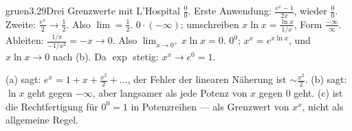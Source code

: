 \begin{loesungkarte}{gruen}{3.29}{Drei Grenzwerte mit L'Hospital}
$\frac00$. Erste Anwendung: $\frac{e^{x} - 1}{2x}$, wieder $\frac00$. Zweite: $\frac{e^{x}}2\to\frac12$. Also $\lim = \frac12$.
$0\cdot(-\infty)$; umschreiben $x\ln x = \frac{\ln x}{1/x}$, Form $\frac{-\infty}{\infty}$. Ableiten: $\frac{1/x}{-1/x^{2}} = -x\to0$. Also $\lim_{x\to0^{+}}x\ln x = 0$.
$0^{0}$; $x^{x} = e^{x\ln x}$, und $x\ln x\to0$ nach (b). Da $\exp$ stetig: $x^{x}\to e^{0} = 1$.
\begin{mitnehmen}\kastentext
(a) sagt: $e^{x} = 1 + x + \frac{x^{2}}2 + \dots$, der Fehler der linearen Näherung ist $\sim\frac{x^{2}}2$. (b) sagt: $\ln x$ geht gegen $-\infty$, aber langsamer als jede Potenz von $x$ gegen $0$ geht. (c) ist die Rechtfertigung für $0^{0} = 1$ in Potenzreihen --- als Grenzwert von $x^{x}$, nicht als allgemeine Regel.
\end{mitnehmen}
\end{loesungkarte}

